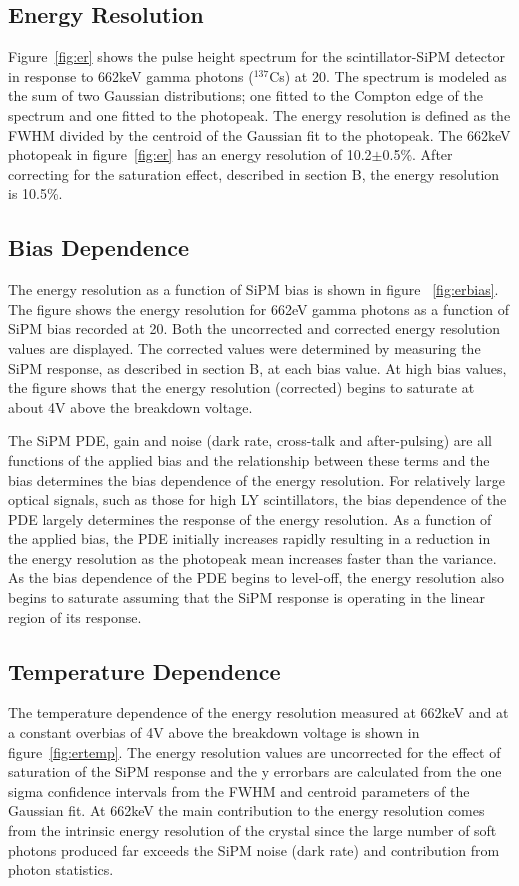 \documentclass[journal]{IEEEtran}
\begin{document}
\subsection{Energy Resolution}

Figure~\ref{fig:er} shows the pulse height spectrum for the scintillator-SiPM detector in response to 662keV gamma photons ($^{137}$Cs) at 20\celsius{}. The spectrum is modeled as the sum of two Gaussian distributions; one fitted to the Compton edge of the spectrum and one fitted to the photopeak. The energy resolution is defined as the FWHM divided by the centroid of the Gaussian fit to the photopeak. The 662keV photopeak in figure~\ref{fig:er} has an energy resolution of 10.2$\pm$0.5\%. After correcting for the saturation effect, described in section B, the energy resolution is 10.5\%.  

\subsection{Bias Dependence}
The energy resolution as a function of SiPM bias is shown in figure ~\ref{fig:erbias}. The figure shows the energy resolution for 662eV gamma photons as a function of SiPM bias recorded at 20\celsius{}. Both the uncorrected and corrected energy resolution values are displayed. The corrected values were determined by measuring the SiPM response, as described in section B, at each bias value. At high bias values, the figure shows that the energy resolution (corrected) begins to saturate at about 4V above the breakdown voltage. 

The SiPM PDE, gain and noise (dark rate, cross-talk and after-pulsing) are all functions of the applied bias and the relationship between these terms and the bias determines the bias dependence of the energy resolution. For relatively large optical signals, such as those for high LY scintillators, the bias dependence of the PDE largely determines the response of the energy resolution. As a function of the applied bias, the PDE initially increases rapidly resulting in a reduction in the energy resolution as the photopeak mean increases faster than the variance. As the bias dependence of the PDE begins to level-off, the energy resolution also begins to saturate assuming that the SiPM response is operating in the linear region of its response. 

\subsection{Temperature Dependence}
The temperature dependence of the energy resolution measured at 662keV and at a constant overbias of 4V above the breakdown voltage is shown in figure~\ref{fig:ertemp}. The energy resolution values are uncorrected for the effect of saturation of the SiPM response and the y errorbars are calculated from the one sigma confidence intervals from the FWHM and centroid parameters of the Gaussian fit. At 662keV the main contribution to the energy resolution comes from the intrinsic energy resolution of the crystal since the large number of soft photons produced far exceeds the SiPM noise (dark rate) and contribution from photon statistics. 
\end{document}
